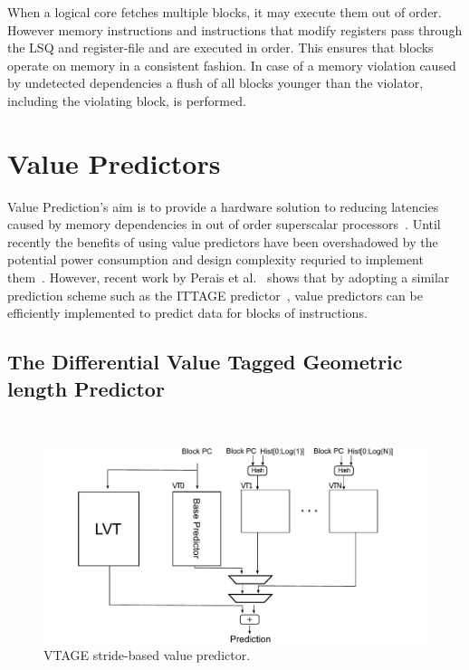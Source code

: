 When a logical core fetches multiple blocks, it may execute them out of order.
However memory instructions and instructions that modify registers pass through the LSQ and register-file and are executed in order.
This ensures that blocks operate on memory in a consistent fashion.
In case of a memory violation caused by undetected dependencies a flush of all blocks younger than the violator, including the violating block, is performed.


\section{Value Predictors}
Value Prediction's aim is to provide a hardware solution to reducing latencies caused by memory dependencies in out of order superscalar processors~\cite{gabbayVPOrig}.
Until recently the benefits of using value predictors have been overshadowed by the potential power consumption and design complexity requried to implement them~\cite{peraisVTAGE2014}.
However, recent work by Perais et al.~\cite{peraisVTAGE2014,peraisBeBop2015} shows that by adopting a similar prediction scheme such as the ITTAGE predictor~\cite{SeznecITTAGE}, value predictors can be efficiently implemented to predict data for blocks of instructions.

\subsection{The Differential Value Tagged Geometric length Predictor}~\label{chp:bck:vtage}
\begin{figure}[t]
    \centering
    \includegraphics[width=1\textwidth]{chapter3/graphics/basic_valpred.pdf}

    \caption{VTAGE stride-based value predictor.}
    \label{fig:stride_over}
\end{figure}

